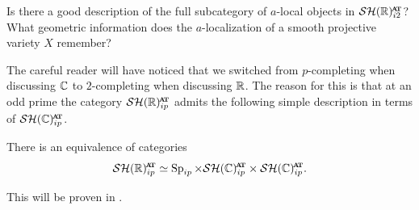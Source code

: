 \begin{qst}
  Is there a good description of the full subcategory of $a$-local objects in $\SHRat$?
  What geometric information does the $a$-localization of a smooth projective variety $X$ remember?
\end{qst}


The careful reader will have noticed that we switched from $p$-completing when discussing $\mathbb{C}$ to $2$-completing when discussing $\mathbb{R}$. The reason for this is that at an odd prime the category $\SHR^{\at}_{ip}$ admits the following simple description in terms of $\SHCat$.

\begin{prop}
  There is an equivalence of categories
  \[ \SHR^{\at}_{ip} \simeq \Sp_{ip} \times \SHCat \times \SHCat. \]
\end{prop}

This will be proven in .






